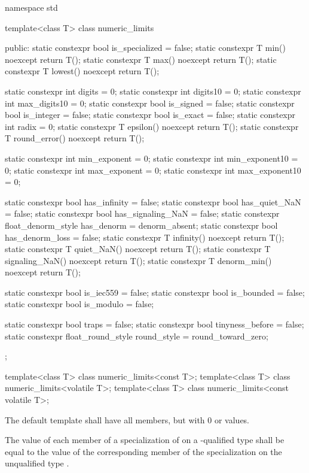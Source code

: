 %
\begin{codeblock}
namespace std {
  template<class T> class numeric_limits {
  public:
    static constexpr bool is_specialized = false;
    static constexpr T min() noexcept { return T(); }
    static constexpr T max() noexcept { return T(); }
    static constexpr T lowest() noexcept { return T(); }

    static constexpr int  digits = 0;
    static constexpr int  digits10 = 0;
    static constexpr int  max_digits10 = 0;
    static constexpr bool is_signed = false;
    static constexpr bool is_integer = false;
    static constexpr bool is_exact = false;
    static constexpr int  radix = 0;
    static constexpr T epsilon() noexcept { return T(); }
    static constexpr T round_error() noexcept { return T(); }

    static constexpr int  min_exponent = 0;
    static constexpr int  min_exponent10 = 0;
    static constexpr int  max_exponent = 0;
    static constexpr int  max_exponent10 = 0;

    static constexpr bool has_infinity = false;
    static constexpr bool has_quiet_NaN = false;
    static constexpr bool has_signaling_NaN = false;
    static constexpr float_denorm_style has_denorm = denorm_absent;
    static constexpr bool has_denorm_loss = false;
    static constexpr T infinity() noexcept { return T(); }
    static constexpr T quiet_NaN() noexcept { return T(); }
    static constexpr T signaling_NaN() noexcept { return T(); }
    static constexpr T denorm_min() noexcept { return T(); }

    static constexpr bool is_iec559 = false;
    static constexpr bool is_bounded = false;
    static constexpr bool is_modulo = false;

    static constexpr bool traps = false;
    static constexpr bool tinyness_before = false;
    static constexpr float_round_style round_style = round_toward_zero;
  };

  template<class T> class numeric_limits<const T>;
  template<class T> class numeric_limits<volatile T>;
  template<class T> class numeric_limits<const volatile T>;
}
\end{codeblock}

\pnum
The default
template shall have all members, but with 0 or
values.

\pnum
The value of each member of a specialization of
 on a -qualified type
 shall be equal to the value of the corresponding member of
the specialization on the unqualified type .

